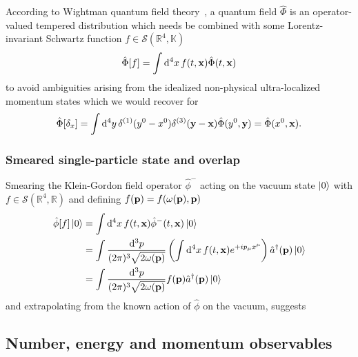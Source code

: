According to Wightman quantum field theory~\cite[p.~324]{Bogolubov1989}, a quantum field $\hat\Phi$ is an operator-valued tempered distribution which needs be combined with some Lorentz-invariant Schwartz function $f\in\mathcal{S}(\mathbb{R}^4,\mathbb{K})$
\begin{equation}
	\hat\Phi[f]
	=
	\int\dd[4]{x}
	f(t,\vb{x})
	\hat\Phi(t,\vb{x})
\end{equation}
to avoid ambiguities arising from the idealized non-physical ultra-localized momentum states which we would recover for
\begin{equation}
	\hat\Phi[\delta_x]
	=
	\int\dd[4]{y}
	\delta^{(1)}(y^0-x^0)
	\delta^{(3)}(\vb{y}-\vb{x})
	\hat\Phi(y^0,\vb{y})
	=
	\hat\Phi(x^0,\vb{x})
	.
\end{equation}

\subsubsection{Smeared single-particle state and overlap}

Smearing the Klein-Gordon field operator $\hat\phi^-$ acting on the vacuum state $\ket{0}$ with $f\in\mathcal{S}(\mathbb{R}^4,\mathbb{R})$ and defining $f(\vb{p})=f(\omega(\vb{p}),\vb{p})$
\begin{align}
	\hat\phi[f]
	\ket{0}
	&=
	\int\dd[4]{x}
	f(t,\vb{x})
	\hat\phi^-(t,\vb{x})
	\ket{0}
	\\
	&=
	\int\frac{\dd[3]{p}}{(2\pi)^3\sqrt{2\omega(\vb{p})}}
	\left(
		\int\dd[4]{x}
		f(t,\vb{x})
		e^{+ip_\mu x^\mu}
	\right)
	\hat{a}^\dagger(\vb{p})
	\ket{0}
	\\
	&=
	\int\frac{\dd[3]{p}}{(2\pi)^3\sqrt{2\omega(\vb{p})}}
	f(\vb{p})
	\hat{a}^\dagger(\vb{p})
	\ket{0}
\end{align}
and extrapolating from the known action of $\hat\phi$ on the vacuum, suggests

\subsection{Number, energy and momentum observables}

